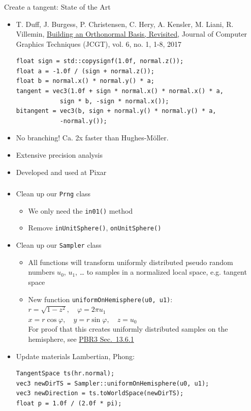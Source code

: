 \documentclass[utf8,stillsansserifmath,fleqn,t]{beamer}
\newcommand{\code}[1]{\texttt{#1}}
\begin{document}
\begin{frame}[fragile]
\frametitle{\insertsection}
Create a tangent: State of the Art
\begin{itemize}
\item T. Duff, J. Burgess, P. Christensen,
C. Hery, A. Kensler, M. Liani, R. Villemin,
\href{https://jcgt.org/published/0006/01/01/}{Building an Orthonormal Basis,
Revisited}, Journal of Computer Graphics
Techniques (JCGT), vol. 6, no. 1, 1-8, 2017
\begin{lstlisting}
float sign = std::copysignf(1.0f, normal.z());
float a = -1.0f / (sign + normal.z());
float b = normal.x() * normal.y() * a;
tangent = vec3(1.0f + sign * normal.x() * normal.x() * a,
            sign * b, -sign * normal.x());
bitangent = vec3(b, sign + normal.y() * normal.y() * a,
            -normal.y());
\end{lstlisting}
\item No branching! Ca. 2x faster than Hughes-Möller.
\item Extensive precision analysis
\item Developed and used at Pixar
\end{itemize}
\end{frame}

\begin{frame}[fragile]
\frametitle{\insertsection}
\begin{itemize}
\item Clean up our \code{Prng} class
    \begin{itemize}
    \item We only need the \code{in01()} method
    \item Remove \code{inUnitSphere()}, \code{onUnitSphere()}
    \end{itemize}
\item Clean up our \code{Sampler} class
    \begin{itemize}
    \item All functions will transform uniformly distributed pseudo random numbers
        $u_0$, $u_1$, \ldots{} to samples in a normalized local space, e.g. tangent space
    \item New function \code{uniformOnHemisphere(u0, u1)}:\\
        $r = \sqrt{1-z^2}, \quad \varphi = 2\pi u_1$\\
        $x = r\cos\varphi, \quad y = r\sin\varphi, \quad z = u_0$\\
        For proof that this creates uniformly distributed samples on the hemisphere,
        see \href{https://www.pbr-book.org/3ed-2018/Monte_Carlo_Integration/2D_Sampling_with_Multidimensional_Transformations}{PBR3 Sec.~13.6.1}
    \end{itemize}
\item Update materials Lambertian, Phong:
\begin{lstlisting}
TangentSpace ts(hr.normal);
vec3 newDirTS = Sampler::uniformOnHemisphere(u0, u1);
vec3 newDirection = ts.toWorldSpace(newDirTS);
float p = 1.0f / (2.0f * pi);
\end{lstlisting}
\end{itemize}
\end{frame}
\end{document}
